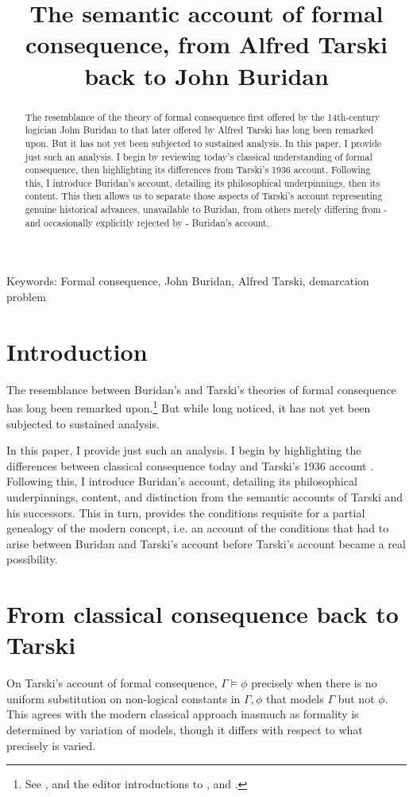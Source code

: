 \documentclass[]{article}
\title{The semantic account of formal consequence, from Alfred Tarski back to John Buridan}
\author{}
\begin{document}
	
\maketitle
\begin{abstract}
	The resemblance of the theory of formal consequence first offered by the 14th-century logician John Buridan to that later offered by Alfred Tarski has long been remarked upon. But it has not yet been subjected to sustained analysis. In this paper, I provide just such an analysis. I begin by reviewing today's classical understanding of formal consequence, then highlighting its differences from Tarski's 1936 account. Following this, I introduce Buridan's account, detailing its philosophical underpinnings, then its content. This then allows us to separate those aspects of Tarski's account representing genuine historical advances, unavailable to Buridan, from others merely differing from - and occasionally explicitly rejected by - Buridan's account.
\end{abstract}
Keywords: Formal consequence, John Buridan, Alfred Tarski, demarcation problem

\section{Introduction}
The resemblance between Buridan's and Tarski's theories of formal consequence has long been remarked upon.\footnote{See \autocite{Moody1952} \autocite{Kneale1962} \autocite{Dumitriu1974} \autocite{DutilhNovaes2012a} \autocite{DutilhNovaes2012c} \autocite{Parsons2014}, and the editor introductions to \autocite{BuridanTC}, \autocite{Kretzmann1982} and \autocite{King1985}.} But while long noticed, it has not yet been subjected to sustained analysis.

In this paper, I provide just such an analysis. I begin by highlighting the differences between classical consequence today and Tarski's 1936 account \autocite{Tarski2002}. Following this, I introduce Buridan's account, detailing its philosophical underpinnings, content, and distinction from the semantic accounts of Tarski and his successors. This in turn, provides the conditions requisite for a partial genealogy of the modern concept, i.e. an account of the conditions that had to arise between Buridan and Tarski's account before Tarski's account became a real possibility.
\section{From classical consequence back to Tarski}
On Tarski's account of formal consequence, $\Gamma \models \phi$ precisely when there is no uniform substitution on  non-logical constants in $\Gamma, \phi$ that models $\Gamma$ but not $\phi$. This agrees with the modern classical approach inasmuch as formality is determined by variation of models, though it differs with respect to what precisely is varied.
\end{document}
